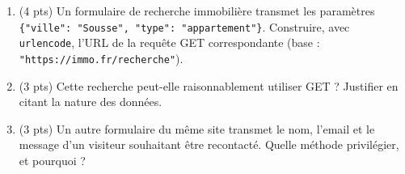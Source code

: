 \begin{enumerate}
  \item (4 pts) Un formulaire de recherche immobilière transmet les paramètres \lstinline|{"ville": "Sousse", "type": "appartement"}|. Construire, avec \lstinline{urlencode}, l'URL de la requête GET correspondante (base : \lstinline{"https://immo.fr/recherche"}).
  \item (3 pts) Cette recherche peut-elle raisonnablement utiliser GET ? Justifier en citant la nature des données.
  \item (3 pts) Un autre formulaire du même site transmet le nom, l'email et le message d'un visiteur souhaitant être recontacté. Quelle méthode privilégier, et pourquoi ?
\end{enumerate}

